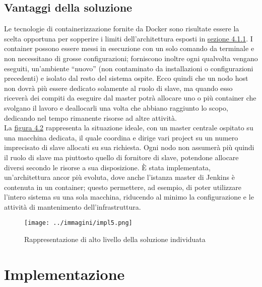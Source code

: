 \subsection{Vantaggi della soluzione}

Le tecnologie di containerizzazione fornite da Docker sono risultate essere la scelta opportuna per sopperire i limiti dell'architettura esposti in \hyperref[subsec:limiti]{sezione 4.1.1}. I \gls{container} possono essere messi in esecuzione con un solo comando da terminale e non necessitano di grosse configurazioni; forniscono inoltre ogni qualvolta vengano eseguiti, un'ambiente ``nuovo'' (non contaminato da installazioni o configurazioni precedenti) e isolato dal resto del sistema ospite. Ecco quindi che un nodo \gls{host} non dovrà più essere dedicato solamente al ruolo di \gls{slave}, ma quando esso riceverà dei compiti da eseguire dal \gls{master} potrà allocare uno o più \gls{container} che svolgano il lavoro e deallocarli una volta che abbiano raggiunto lo scopo, dedicando nel tempo rimanente risorse ad altre attività.\\

La \hyperref[fig:impl5]{figura 4.2} rappresenta la situazione ideale, con un \gls{master} centrale ospitato su una macchina dedicata, il quale coordina e dirige vari \gls{project} su un numero imprecisato di slave allocati su sua richiesta. Ogni nodo non assumerà più quindi il ruolo di \gls{slave} ma piuttosto quello di fornitore di \gls{slave}, potendone allocare diversi secondo le risorse a sua disposizione. \`E stata implementata, un'architettura ancor più evoluta, dove anche l'istanza \gls{master} di Jenkins è contenuta in un \gls{container}; questo permettere, ad esempio, di poter utilizzare l'intero sistema su una sola macchina, riducendo al minimo la configurazione e le attività di mantenimento dell'infrastruttura.

\begin{figure}[H]
    \capstart
    \centering
    \texttt{[image: ../immagini/impl5.png]}
    \caption{Rappresentazione di alto livello della soluzione individuata}
    \label{fig:impl5}
\end{figure}

\section{Implementazione}

